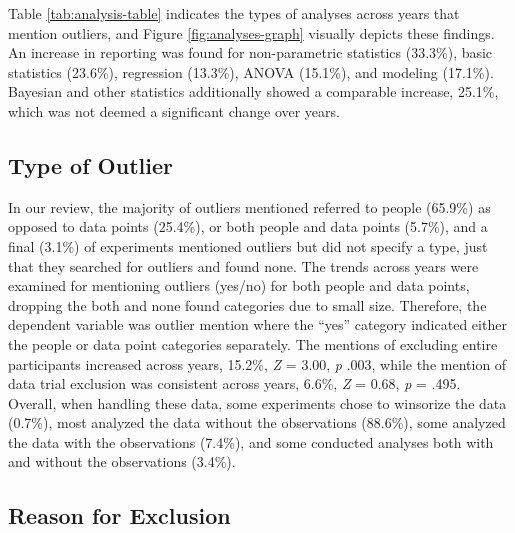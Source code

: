 \documentclass[english,,man]{apa6}
\begin{document}
Table \ref{tab:analysis-table} indicates the types of analyses across years that mention outliers, and Figure \ref{fig:analyses-graph} visually depicts these findings. An increase in reporting was found for non-parametric statistics (33.3\%), basic statistics (23.6\%), regression (13.3\%), ANOVA (15.1\%), and modeling (17.1\%). Bayesian and other statistics additionally showed a comparable increase, 25.1\%, which was not deemed a significant change over years.

\hypertarget{type-of-outlier}{%
\subsection{Type of Outlier}\label{type-of-outlier}}

In our review, the majority of outliers mentioned referred to people (65.9\%) as opposed to data points (25.4\%), or both people and data points (5.7\%), and a final (3.1\%) of experiments mentioned outliers but did not specify a type, just that they searched for outliers and found none. The trends across years were examined for mentioning outliers (yes/no) for both people and data points, dropping the both and none found categories due to small size. Therefore, the dependent variable was outlier mention where the \enquote{yes} category indicated either the people or data point categories separately. The mentions of excluding entire participants increased across years, 15.2\%, \emph{Z} = 3.00, \emph{p} .003, while the mention of data trial exclusion was consistent across years, 6.6\%, \emph{Z} = 0.68, \emph{p} = .495. Overall, when handling these data, some experiments chose to winsorize the data (0.7\%), most analyzed the data without the observations (88.6\%), some analyzed the data with the observations (7.4\%), and some conducted analyses both with and without the observations (3.4\%).

\hypertarget{reason-for-exclusion}{%
\subsection{Reason for Exclusion}\label{reason-for-exclusion}}
\end{document}
